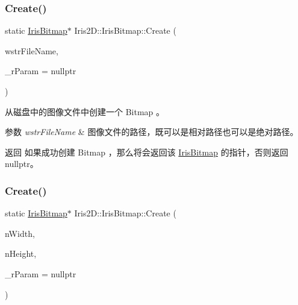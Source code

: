 \subsubsection{\texorpdfstring{Create()}{Create()}\hspace{0.1cm}{\footnotesize\ttfamily [1/2]}}
{\footnotesize\ttfamily static \hyperlink{class_iris2_d_1_1_iris_bitmap}{Iris\+Bitmap}$\ast$ Iris2\+D\+::\+Iris\+Bitmap\+::\+Create (\begin{DoxyParamCaption}\item[{const std\+::wstring \&}]{wstr\+File\+Name,  }\item[{Iris\+Result $\ast$}]{\+\_\+r\+Param = {\ttfamily nullptr} }\end{DoxyParamCaption})\hspace{0.3cm}{\ttfamily [static]}}



从磁盘中的图像文件中创建一个 Bitmap 。 


\begin{DoxyParams}{参数}
{\em wstr\+File\+Name} & 图像文件的路径，既可以是相对路径也可以是绝对路径。 \\
\hline
\end{DoxyParams}
\begin{DoxyReturn}{返回}
如果成功创建 Bitmap ，那么将会返回该 \hyperlink{class_iris2_d_1_1_iris_bitmap}{Iris\+Bitmap} 的指针，否则返回 nullptr。 
\end{DoxyReturn}
\mbox{\label{class_iris2_d_1_1_iris_bitmap_a42a6c58440df5bb965a2d299cd3620e4}} 
\subsubsection{\texorpdfstring{Create()}{Create()}\hspace{0.1cm}{\footnotesize\ttfamily [2/2]}}
{\footnotesize\ttfamily static \hyperlink{class_iris2_d_1_1_iris_bitmap}{Iris\+Bitmap}$\ast$ Iris2\+D\+::\+Iris\+Bitmap\+::\+Create (\begin{DoxyParamCaption}\item[{unsigned int}]{n\+Width,  }\item[{unsigned int}]{n\+Height,  }\item[{Iris\+Result $\ast$}]{\+\_\+r\+Param = {\ttfamily nullptr} }\end{DoxyParamCaption})\hspace{0.3cm}{\ttfamily [static]}}



